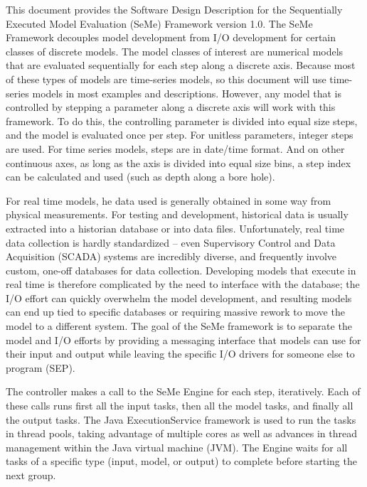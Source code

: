 This document provides the Software Design Description for the Sequentially Executed Model Evaluation (SeMe) Framework version 1.0. The SeMe Framework decouples model development from I/O development for certain classes of discrete models. The model classes of interest are numerical models that are evaluated sequentially for each step along a discrete axis. Because most of these types of models are time-series models, so this document will use time-series models in most examples and descriptions. However, any model that is controlled by stepping a parameter along a discrete axis will work with this framework. To do this, the controlling parameter is divided into equal size steps, and the model is evaluated once per step. For unitless parameters, integer steps are used. For time series models, steps are in date/time format. And on other continuous axes, as long as the axis is divided into equal size bins, a step index can be calculated and used (such as depth along a bore hole).

For real time models, he data used is generally obtained in some way from physical measurements. For testing and development, historical data is usually extracted into a historian database or into data files. Unfortunately, real time data collection is hardly standardized – even Supervisory Control and Data Acquisition (SCADA) systems are incredibly diverse, and frequently involve custom, one-off databases for data collection. Developing models that execute in real time is therefore complicated by the need to interface with the database; the I/O effort can quickly overwhelm the model development, and resulting models can end up tied to specific databases or requiring massive rework to move the model to a different system. The goal of the SeMe framework is to separate the model and I/O efforts by providing a messaging interface that models can use for their input and output while leaving the specific I/O drivers for someone else to program (SEP).

The controller makes a call to the SeMe Engine for each step, iteratively. Each of these calls runs first all the input tasks, then all the model tasks, and finally all the output tasks. The Java ExecutionService framework is used to run the tasks in thread pools, taking advantage of multiple cores as well as advances in thread management within the Java virtual machine (JVM). The Engine waits for all tasks of a specific type (input, model, or output) to complete before starting the next group. 